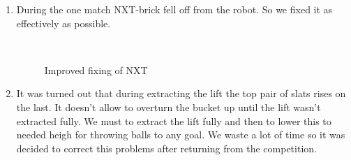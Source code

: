 \begin{enumerate}
	\item During the one match NXT-brick fell off from the robot. So we fixed it as effectively as possible.
	
	\begin{figure}[H]
		\begin{minipage}[h]{0.2\linewidth}
			\center  
		\end{minipage}
		\begin{minipage}[h]{0.6\linewidth}
			\caption{Improved fixing of NXT}
		\end{minipage}
	\end{figure}
	
	\item It was turned out that during extracting the lift the top pair of slats rises on the last. It doesn't allow to overturn the bucket up until the lift wasn't extracted fully. We must to extract the lift fully and then to lower this to needed heigh for throwing balls to any goal. We waste a lot of time so it was decided to correct this problems after returning from the competition.
	
\end{enumerate}
\fillpage
